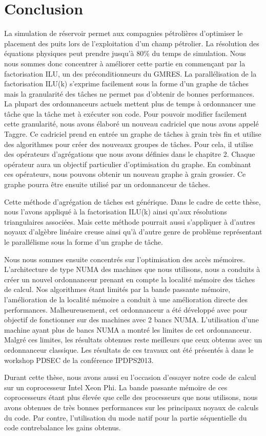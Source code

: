\section{Conclusion}
La simulation de réservoir permet aux compagnies pétrolières d'optimiser le placement des puits lors de l'exploitation d'un champ pétrolier.
%
La résolution des équations physiques peut prendre jusqu'à 80\% du temps de simulation.
%
Nous nous sommes donc concentrer à améliorer cette partie en commençant par la factorisation ILU, un des préconditionneurs du GMRES.
%
La parallélisation de la factorisation ILU(k) s'exprime facilement sous la forme d'un graphe de tâches mais la granularité des tâches ne permet pas d'obtenir de bonnes performances.
%
La plupart des ordonnanceurs actuels mettent plus de temps à ordonnancer une tâche que la tâche met à exécuter son code.
%
Pour pouvoir modifier facilement cette granularité, nous avons élaboré un nouveau cadriciel que nous avons appelé Taggre.
%
Ce cadriciel prend en entrée un graphe de tâches à grain très fin et utilise des algorithmes pour créer des nouveaux groupes de tâches.
%
Pour cela, il utilise des opérateurs d'agrégations que nous avons définies dans le chapitre 2.
%
Chaque opérateur aura un objectif particulier d'optimisation du graphe.
%
En combinant ces opérateurs, nous pouvons obtenir un nouveau graphe à grain grossier.
%
Ce graphe pourra être ensuite utilisé par un ordonnanceur de tâches.


Cette méthode d'agrégation de tâches est générique.
%
Dans le cadre de cette thèse, nous l'avons appliqué à la factorisation ILU(k) ainsi qu'aux résolutions triangulaires associées.
%
Mais cette méthode pourrait aussi s'appliquer à d'autres noyaux d'algèbre linéaire creuse ainsi qu'à d'autre genre de problème représentant le parallélisme sous la forme d'un graphe de tâche.


Nous nous sommes ensuite concentrés sur l'optimisation des accès mémoires.
%
L'architecture de type NUMA des machines que nous utilisons, nous a conduits à créer un nouvel ordonnanceur prenant en compte la localité mémoire des tâches de calcul.
%
Nos algorithmes étant limités par la bande passante mémoire, l'amélioration de la localité mémoire a conduit à une amélioration directe des performances.
%
Malheureusement, cet ordonnanceur a été développé avec pour objectif de fonctionner sur des machines avec 2 bancs NUMA.
%
L'utilisation d'une machine ayant plus de bancs NUMA a montré les limites de cet ordonnanceur.
%
Malgré ces limites, les résultats obtenues reste meilleurs que ceux obtenus avec un ordonnanceur classique.
%
Les résultats de ces travaux ont été présentés à dans le workshop PDSEC de la conférence IPDPS2013.


Durant cette thèse, nous avons aussi eu l'occasion d'essayer notre code de calcul sur un coprocesseur Intel Xeon Phi.
%
La bande passante mémoire de ces coprocesseurs étant plus élevée que celle des processeurs que nous utilisons, nous avons obtenues de très bonnes performances sur les principaux noyaux de calculs du code.
%
Par contre, l'utilisation du mode natif pour la partie séquentielle du code contrebalance les gains obtenus.
